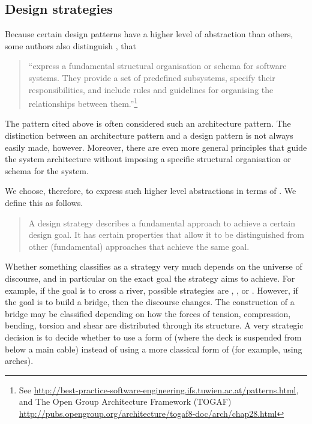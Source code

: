\subsection{Design strategies}

Because certain design patterns have a higher level of abstraction than others, some authors also distinguish , that
\begin{quote}
``express a fundamental structural organisation or schema for software systems. They provide a set of predefined subsystems, specify their responsibilities, and include rules and guidelines for organising the relationships between them.''\footnote{See \url{http://best-practice-software-engineering.ifs.tuwien.ac.at/patterns.html},
and The Open Group Architecture Framework (TOGAF)\\ \url{http://pubs.opengroup.org/architecture/togaf8-doc/arch/chap28.html}
}
\end{quote}
The  pattern cited above is often considered such an architecture pattern. The distinction between an architecture pattern and a design pattern is not always easily made, however. Moreover, there are even more general principles that guide the system architecture without imposing a specific structural organisation or schema for the system. 

We choose, therefore, to express such higher level abstractions in terms of . We define this as follows.
\begin{quote}
A design strategy describes a fundamental approach to achieve a certain design goal. It has certain properties that allow it to be distinguished from other (fundamental) approaches that achieve the same goal.
\end{quote}
Whether something classifies as a strategy very much depends on the universe of discourse, and in particular on the exact goal the strategy aims to achieve. For example, if the goal is to cross a river, possible strategies are , , or . However, if the goal is to build a bridge, then the discourse changes. The construction of a bridge may be classified depending on how the forces of tension, compression, bending, torsion and shear are distributed through its structure. A very strategic decision is to decide whether to use a form of  (where the deck is suspended from below a main cable) instead of using a more classical form of  (for example, using arches).

